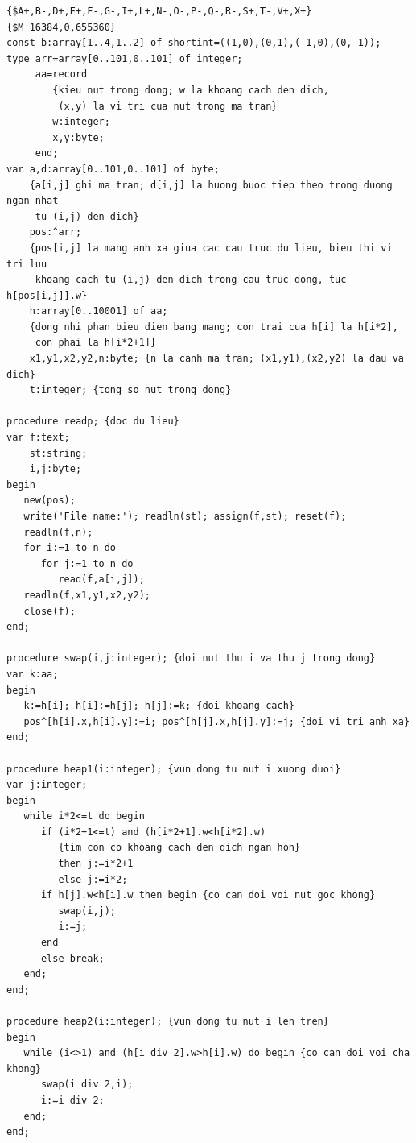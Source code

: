 \documentclass[11pt]{article}
\begin{document}
\begin{verbatim}
{$A+,B-,D+,E+,F-,G-,I+,L+,N-,O-,P-,Q-,R-,S+,T-,V+,X+}
{$M 16384,0,655360}
const b:array[1..4,1..2] of shortint=((1,0),(0,1),(-1,0),(0,-1));
type arr=array[0..101,0..101] of integer;
     aa=record
        {kieu nut trong dong; w la khoang cach den dich,
         (x,y) la vi tri cua nut trong ma tran}
        w:integer;
        x,y:byte;
     end;
var a,d:array[0..101,0..101] of byte;
    {a[i,j] ghi ma tran; d[i,j] la huong buoc tiep theo trong duong ngan nhat
     tu (i,j) den dich}
    pos:^arr;
    {pos[i,j] la mang anh xa giua cac cau truc du lieu, bieu thi vi tri luu
     khoang cach tu (i,j) den dich trong cau truc dong, tuc h[pos[i,j]].w}
    h:array[0..10001] of aa;
    {dong nhi phan bieu dien bang mang; con trai cua h[i] la h[i*2],
     con phai la h[i*2+1]}
    x1,y1,x2,y2,n:byte; {n la canh ma tran; (x1,y1),(x2,y2) la dau va dich}
    t:integer; {tong so nut trong dong}

procedure readp; {doc du lieu}
var f:text;
    st:string;
    i,j:byte;
begin
   new(pos);
   write('File name:'); readln(st); assign(f,st); reset(f);
   readln(f,n);
   for i:=1 to n do
      for j:=1 to n do
         read(f,a[i,j]);
   readln(f,x1,y1,x2,y2);
   close(f);
end;

procedure swap(i,j:integer); {doi nut thu i va thu j trong dong}
var k:aa;
begin
   k:=h[i]; h[i]:=h[j]; h[j]:=k; {doi khoang cach}
   pos^[h[i].x,h[i].y]:=i; pos^[h[j].x,h[j].y]:=j; {doi vi tri anh xa}
end;

procedure heap1(i:integer); {vun dong tu nut i xuong duoi}
var j:integer;
begin
   while i*2<=t do begin
      if (i*2+1<=t) and (h[i*2+1].w<h[i*2].w)
         {tim con co khoang cach den dich ngan hon}
         then j:=i*2+1
         else j:=i*2;
      if h[j].w<h[i].w then begin {co can doi voi nut goc khong}
         swap(i,j);
         i:=j;
      end
      else break;
   end;
end;

procedure heap2(i:integer); {vun dong tu nut i len tren}
begin
   while (i<>1) and (h[i div 2].w>h[i].w) do begin {co can doi voi cha khong}
      swap(i div 2,i);
      i:=i div 2;
   end;
end;


\end{verbatim}
\end{document}
